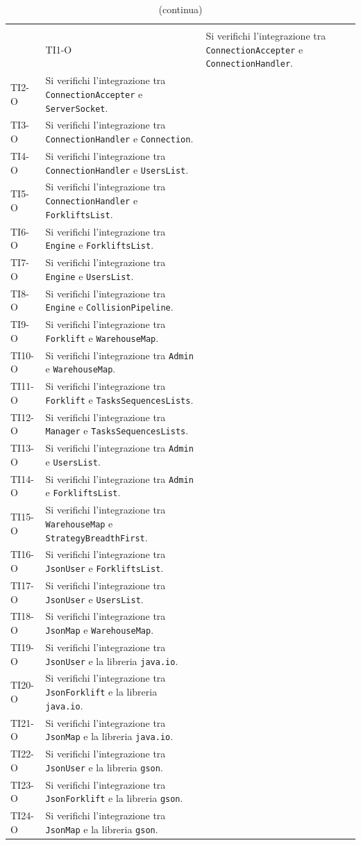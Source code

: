 		\begin{longtable}{ >{\centering}p{} >{}p{}}
		
		
		\caption{Riepilogo Test di Integrazione}\\
		\hline
		\rowcolorhead
		 & \headertitle{Descrizione}
		\endfirsthead
		\caption[]{(continua)}\\
		\rowcolorhead
		 & \headertitle{Descrizione}
		\endhead
		
		
		
		TI1-O & Si verifichi l'integrazione tra \texttt{ConnectionAccepter} e \texttt{ConnectionHandler}. \tabularnewline
		TI2-O & Si verifichi l'integrazione tra \texttt{ConnectionAccepter} e \texttt{ServerSocket}. \tabularnewline
		TI3-O & Si verifichi l'integrazione tra \texttt{ConnectionHandler} e \texttt{Connection}. \tabularnewline
		TI4-O & Si verifichi l'integrazione tra \texttt{ConnectionHandler} e \texttt{UsersList}. \tabularnewline
		TI5-O & Si verifichi l'integrazione tra \texttt{ConnectionHandler} e \texttt{ForkliftsList}. \tabularnewline
		TI6-O & Si verifichi l'integrazione tra \texttt{Engine} e \texttt{ForkliftsList}. \tabularnewline
		TI7-O & Si verifichi l'integrazione tra \texttt{Engine} e \texttt{UsersList}. \tabularnewline
		TI8-O & Si verifichi l'integrazione tra \texttt{Engine} e \texttt{CollisionPipeline}. \tabularnewline
		TI9-O & Si verifichi l'integrazione tra \texttt{Forklift} e \texttt{WarehouseMap}. \tabularnewline
		TI10-O & Si verifichi l'integrazione tra \texttt{Admin} e \texttt{WarehouseMap}. \tabularnewline
		TI11-O & Si verifichi l'integrazione tra \texttt{Forklift} e \texttt{TasksSequencesLists}. \tabularnewline
		TI12-O & Si verifichi l'integrazione tra \texttt{Manager} e \texttt{TasksSequencesLists}. \tabularnewline
		TI13-O & Si verifichi l'integrazione tra \texttt{Admin} e \texttt{UsersList}. \tabularnewline
		TI14-O & Si verifichi l'integrazione tra \texttt{Admin} e \texttt{ForkliftsList}. \tabularnewline
		TI15-O & Si verifichi l'integrazione tra \texttt{WarehouseMap} e \texttt{StrategyBreadthFirst}. \tabularnewline
		TI16-O & Si verifichi l'integrazione tra \texttt{JsonUser} e \texttt{ForkliftsList}. \tabularnewline
		TI17-O & Si verifichi l'integrazione tra \texttt{JsonUser} e \texttt{UsersList}. \tabularnewline
		TI18-O & Si verifichi l'integrazione tra \texttt{JsonMap} e \texttt{WarehouseMap}. \tabularnewline
		TI19-O & Si verifichi l'integrazione tra \texttt{JsonUser} e la libreria \texttt{java.io}. \tabularnewline
		TI20-O & Si verifichi l'integrazione tra \texttt{JsonForklift} e la libreria \texttt{java.io}. \tabularnewline
		TI21-O & Si verifichi l'integrazione tra \texttt{JsonMap} e la libreria \texttt{java.io}. \tabularnewline
		TI22-O & Si verifichi l'integrazione tra \texttt{JsonUser} e la libreria \texttt{gson}. \tabularnewline
		TI23-O & Si verifichi l'integrazione tra \texttt{JsonForklift} e la libreria \texttt{gson}. \tabularnewline
		TI24-O & Si verifichi l'integrazione tra \texttt{JsonMap} e la libreria \texttt{gson}. \tabularnewline
	\end{longtable}
\pagebreak
